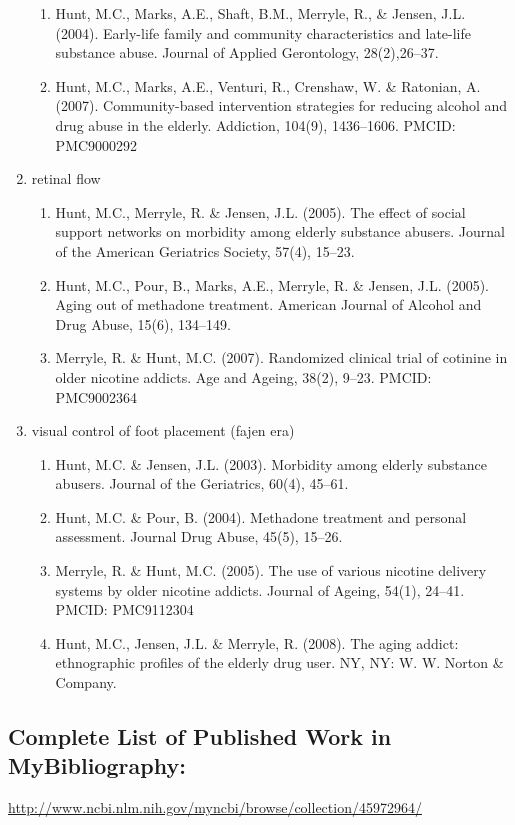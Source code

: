 \documentclass{nihbiosketch}
\begin{document}
\begin{enumerate}
\begin{enumerate}
\item Hunt, M.C., Marks, A.E., Shaft, B.M., Merryle, R., \& Jensen, J.L.
        (2004). Early-life family and community characteristics and late-life
        substance abuse. Journal of Applied Gerontology, 28(2),26--37.

\item Hunt, M.C., Marks, A.E., Venturi, R., Crenshaw, W. \& Ratonian, A.
        (2007). Community-based intervention strategies for reducing alcohol
        and drug abuse in the elderly.  Addiction, 104(9), 1436--1606. PMCID:
        PMC9000292

\end{enumerate}


\item retinal flow  

\begin{enumerate}

\item Hunt, M.C., Merryle, R. \& Jensen, J.L. (2005). The effect of social
        support networks on morbidity among elderly substance abusers. Journal
        of the American Geriatrics Society, 57(4), 15--23.

\item Hunt, M.C., Pour, B., Marks, A.E., Merryle, R. \& Jensen, J.L. (2005).
        Aging out of methadone treatment. American Journal of Alcohol and Drug
        Abuse, 15(6), 134--149. 

\item Merryle, R. \& Hunt, M.C. (2007). Randomized clinical trial of cotinine
        in older nicotine addicts. Age and Ageing, 38(2), 9--23. PMCID:
        PMC9002364

\end{enumerate}

\item visual control of foot placement (fajen era)

\begin{enumerate}   

\item Hunt, M.C. \& Jensen, J.L. (2003). Morbidity among elderly substance
        abusers. Journal of the Geriatrics, 60(4), 45--61.

\item Hunt, M.C. \& Pour, B. (2004). Methadone treatment and personal
        assessment. Journal Drug Abuse, 45(5), 15--26. 

\item  Merryle, R. \& Hunt, M.C. (2005). The use of various nicotine delivery
        systems by older nicotine addicts. Journal of Ageing, 54(1), 24--41.
        PMCID: PMC9112304

\item Hunt, M.C., Jensen, J.L. \& Merryle, R. (2008). The aging addict:
        ethnographic profiles of the elderly drug user.  NY, NY: W. W. Norton
        \& Company.

\end{enumerate}

\end{enumerate}

\subsection*{Complete List of Published Work in MyBibliography:} 
\url{http://www.ncbi.nlm.nih.gov/myncbi/browse/collection/45972964/}
\end{document}
